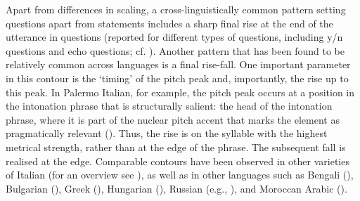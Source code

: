 Apart from differences in scaling, a cross-linguistically common pattern setting questions apart from statements includes a sharp final rise at the end of the utterance in questions (reported for different types of questions, including y/n questions and echo questions; cf. \citealt{Bolinger1978}). Another pattern that has been found to be relatively common across languages is a final rise-fall. One important parameter in this contour is the ‘timing’ of the pitch peak and, importantly, the rise up to this peak. In Palermo Italian, for example, the pitch peak occurs at a position in the intonation phrase that is structurally salient: the head of the intonation phrase, where it is part of the nuclear pitch accent that marks the element as pragmatically relevant (\citealt{Grice1995}). Thus, the rise is on the syllable with the highest metrical strength, rather than at the edge of the phrase. The subsequent fall is realised at the edge. Comparable contours have been observed in other varieties of Italian  (for an overview see \citealt{Grice.etal2005ita,SavinoGrice2011}), as well as in other languages such as Bengali  (\citealt{HayesLahiri1991}), Bulgarian (\citealt{Grice.etal1995}), Greek (\citealt{Arvaniti2001,ArvanitiLadd2009}), Hungarian (\citealt{Ladd1983,GosyTerken1994,Varga2002}), Russian (e.g., \citealt{Makarova2007}), and Moroccan Arabic (\citealt{Benkirane1998}).

